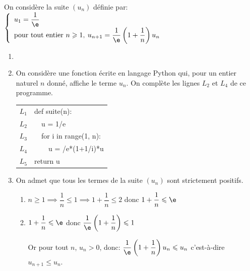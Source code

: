 \medskip

On considère la suite $\left(u_{n}\right)$ définie par: 
$\left\{
\begin{array}{l}
u_{1}=\dfrac{1}{\e} \\
\text{pour tout entier } n \geqslant 1,\: u_{n+1}=\dfrac{1}{\e}\left(1+\dfrac{1}{n}\right) u_{n}
\end{array}
\right.$

\begin{enumerate}
	\item 
{}

	\item On considère une fonction écrite en langage Python qui, pour un entier naturel $n$ donné, affiche le terme $u_{n}$. On complète les lignes $L_{2}$ et $L_{4}$ de ce programme.

	\begin{center}
		\begin{tabular}{|c|>{\ttfamily}l|}
			\hline
			$L_{1}$ & def suite(n): \\
			$L_{2}$ & ~~\blue u = 1/e \\
			$L_{3}$ & ~~for i in range(1, n): \\
			$L_{4}$ & ~~~~u = \blue 1/e*(1+1/i)*u\\
			$L_{5}$ & return u \\
			\hline
		\end{tabular}
	\end{center}

	\item On admet que tous les termes de la suite $\left(u_{n}\right)$ sont strictement positifs.
	\begin{enumerate}
		\item 
$n\geqslant 1 \implies \dfrac{1}{n}\leqslant 1 \implies 1+\dfrac{1}{n}\leqslant 2$ donc $1+\dfrac{1}{n}\leqslant \e$

		\item 
$1+\dfrac{1}{n}\leqslant \e$ donc $\dfrac{1}{\e} \left (1+\dfrac{1}{n}\right )\leqslant 1$

Or pour tout $n$, $u_n>0$, donc:
$\dfrac{1}{\e} \left (1+\dfrac{1}{n}\right ) u_n\leqslant u_n$
c'est-à-dire $u_{n+1}\leqslant u_n$.


\end{enumerate}
\end{enumerate}
